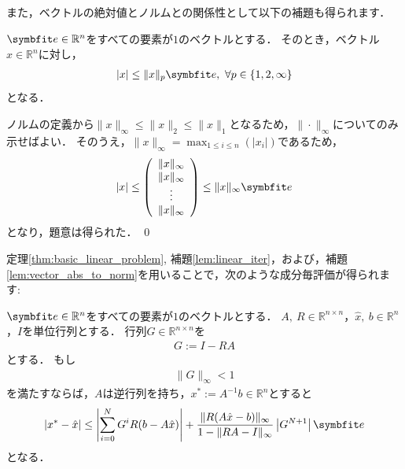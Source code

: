 また，ベクトルの絶対値とノルムとの関係性として以下の補題も得られます．

\begin{Lem}\label{lem:vector_abs_to_norm}
	$\vector{e} \in {\mathbb R}^n$をすべての要素が$1$のベクトルとする．
	そのとき，ベクトル$x \in {\mathbb R}^n$に対し，
	\begin{align*}
		| x | \le \| x \|_{p} \vector{e}, ~ \forall p \in \{ 1, 2, \infty \}
	\end{align*}	
	となる．
\end{Lem}

\begin{Proof}
	ノルムの定義から$\| x \|_{\infty} \le \| x \|_{2} \le \| x \|_{1}$となるため，$\| \cdot \|_{\infty}$についてのみ示せばよい．
	そのうえ，$\| x  \|_{\infty} = \max_{1 \le i \le n} (|x_i|)$であるため，
	\begin{align*}
		| x | \le \left(\begin{array}{c}
			\| x \|_{\infty} \\
			\| x \|_{\infty} \\
				\vdots \\
			\| x \|_{\infty}
		\end{array} \right) \le \| x \|_{\infty} \vector{e}
	\end{align*}
	となり，題意は得られた．
	\qed
\end{Proof}

定理\ref{thm:basic_linear_problem}, 補題\ref{lem:linear_iter}，および，補題\ref{lem:vector_abs_to_norm}を用いることで，次のような成分毎評価が得られます:
\begin{Thm}\label{thm:element_wize}
	$\vector{e} \in {\mathbb R}^n$をすべての要素が$1$のベクトルとする．
	$A,\ R\in {\mathbb R}^{n\times n}$，$\hat{x},\ b\in {\mathbb R}^n$，$I$を単位行列とする．
	行列$G \in {\mathbb R}^{n\times n}$を
	\begin{align*}
		G := I - RA
	\end{align*}
	とする．
	もし
	\begin{align}
		\label{cond:RAminusI2}
		\| G  \|_{\infty} < 1
	\end{align}
	を満たすならば，$A$は逆行列を持ち，$x^* := A^{-1}b \in {\mathbb R}^n$とすると
	\begin{align}
		\label{linear_prpblem_err_element}
		| x^* - \hat{x} | \leq \left| \sum_{i = 0}^N G^i R (b - A \hat{x}) \right| + \frac{ \|R(A\hat{x}-b)\|_{\infty} }{ 1-\|RA-I\|_{\infty} } \left| G^{N + 1} \right| \vector{e} 
	\end{align}
	となる．
\end{Thm}

